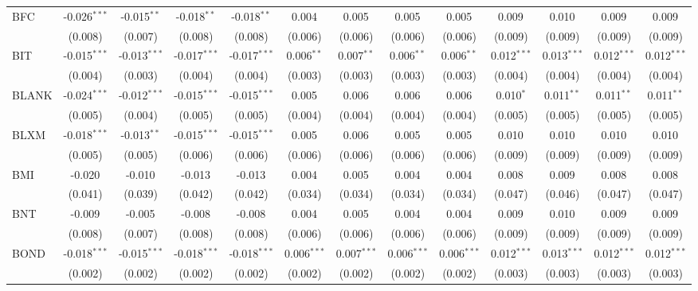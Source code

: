 \begin{table}[!htbp]
\begin{tabular}{@{\extracolsep{5pt}}lcccccccccccc}
 BFC & -0.026$^{***}$ & -0.015$^{**}$ & -0.018$^{**}$ & -0.018$^{**}$ & 0.004$^{}$ & 0.005$^{}$ & 0.005$^{}$ & 0.005$^{}$ & 0.009$^{}$ & 0.010$^{}$ & 0.009$^{}$ & 0.009$^{}$ \\
  & (0.008) & (0.007) & (0.008) & (0.008) & (0.006) & (0.006) & (0.006) & (0.006) & (0.009) & (0.009) & (0.009) & (0.009) \\
 BIT & -0.015$^{***}$ & -0.013$^{***}$ & -0.017$^{***}$ & -0.017$^{***}$ & 0.006$^{**}$ & 0.007$^{**}$ & 0.006$^{**}$ & 0.006$^{**}$ & 0.012$^{***}$ & 0.013$^{***}$ & 0.012$^{***}$ & 0.012$^{***}$ \\
  & (0.004) & (0.003) & (0.004) & (0.004) & (0.003) & (0.003) & (0.003) & (0.003) & (0.004) & (0.004) & (0.004) & (0.004) \\
 BLANK & -0.024$^{***}$ & -0.012$^{***}$ & -0.015$^{***}$ & -0.015$^{***}$ & 0.005$^{}$ & 0.006$^{}$ & 0.006$^{}$ & 0.006$^{}$ & 0.010$^{*}$ & 0.011$^{**}$ & 0.011$^{**}$ & 0.011$^{**}$ \\
  & (0.005) & (0.004) & (0.005) & (0.005) & (0.004) & (0.004) & (0.004) & (0.004) & (0.005) & (0.005) & (0.005) & (0.005) \\
 BLXM & -0.018$^{***}$ & -0.013$^{**}$ & -0.015$^{***}$ & -0.015$^{***}$ & 0.005$^{}$ & 0.006$^{}$ & 0.005$^{}$ & 0.005$^{}$ & 0.010$^{}$ & 0.010$^{}$ & 0.010$^{}$ & 0.010$^{}$ \\
  & (0.005) & (0.005) & (0.006) & (0.006) & (0.006) & (0.006) & (0.006) & (0.006) & (0.009) & (0.009) & (0.009) & (0.009) \\
 BMI & -0.020$^{}$ & -0.010$^{}$ & -0.013$^{}$ & -0.013$^{}$ & 0.004$^{}$ & 0.005$^{}$ & 0.004$^{}$ & 0.004$^{}$ & 0.008$^{}$ & 0.009$^{}$ & 0.008$^{}$ & 0.008$^{}$ \\
  & (0.041) & (0.039) & (0.042) & (0.042) & (0.034) & (0.034) & (0.034) & (0.034) & (0.047) & (0.046) & (0.047) & (0.047) \\
 BNT & -0.009$^{}$ & -0.005$^{}$ & -0.008$^{}$ & -0.008$^{}$ & 0.004$^{}$ & 0.005$^{}$ & 0.004$^{}$ & 0.004$^{}$ & 0.009$^{}$ & 0.010$^{}$ & 0.009$^{}$ & 0.009$^{}$ \\
  & (0.008) & (0.007) & (0.008) & (0.008) & (0.006) & (0.006) & (0.006) & (0.006) & (0.009) & (0.009) & (0.009) & (0.009) \\
 BOND & -0.018$^{***}$ & -0.015$^{***}$ & -0.018$^{***}$ & -0.018$^{***}$ & 0.006$^{***}$ & 0.007$^{***}$ & 0.006$^{***}$ & 0.006$^{***}$ & 0.012$^{***}$ & 0.013$^{***}$ & 0.012$^{***}$ & 0.012$^{***}$ \\
  & (0.002) & (0.002) & (0.002) & (0.002) & (0.002) & (0.002) & (0.002) & (0.002) & (0.003) & (0.003) & (0.003) & (0.003) \\

\end{tabular}
\end{table}
